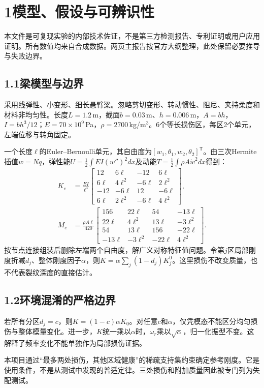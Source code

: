 \documentclass[UTF8,a4paper,11pt,fontset=fandol]{ctexart}
\begin{document}
\section*{1\quad 模型、假设与可辨识性}
本文件是可复现实验的内部技术佐证，不是第三方检测报告、专利证明或用户应用证明。所有数值均来自合成数据。两页主报告按官方大纲整理，此处保留必要推导与失败边界。
\subsection*{1.1\quad 梁模型与边界}
采用线弹性、小变形、细长悬臂梁。忽略剪切变形、转动惯性、阻尼、夹持柔度和材料非均匀性。长度$L=1.2$\,m，截面$b=0.03$\,m、$h=0.006$\,m，$A=bh$，$I=bh^3/12$；$E=70\times10^9$\,Pa，$\rho=2700$\,kg/m$^3$。6个等长损伤区，每区2个单元，左端位移与转角固定。

一个长度$\ell$的Euler--Bernoulli单元，其自由度为$[w_1,\theta_1,w_2,\theta_2]^\mathsf T$。由三次Hermite插值$w=Nq$，弹性能$U=\frac12\int EI(w'')^2dx$及动能$T=\frac12\int\rho A\dot w^2dx$得到：
\begin{align*}
K_e&=\frac{EI}{\ell^3}\begin{bmatrix}12&6\ell&-12&6\ell\\6\ell&4\ell^2&-6\ell&2\ell^2\\-12&-6\ell&12&-6\ell\\6\ell&2\ell^2&-6\ell&4\ell^2\end{bmatrix},\\
M_e&=\frac{\rho A\ell}{420}\begin{bmatrix}156&22\ell&54&-13\ell\\22\ell&4\ell^2&13\ell&-3\ell^2\\54&13\ell&156&-22\ell\\-13\ell&-3\ell^2&-22\ell&4\ell^2\end{bmatrix}.
\end{align*}
按节点连接组装后删除左端两个自由度，解广义对称特征值问题。令第$j$区局部刚度折减$d_j$、整体刚度因子$\alpha$，则$K=\alpha\sum_j(1-d_j)K_j^0$。这里损伤不改变质量，也不代表裂纹深度的直接估计。
\subsection*{1.2\quad 环境混淆的严格边界}
若所有分区$d_j=c$，则$K=(1-c)\alpha K_0$。对任意$c$和$\alpha$，仅凭模态不能区分均匀损伤与整体模量变化。进一步，$K$统一乘以$\alpha$时，$\omega_r$乘以$\sqrt\alpha$，归一化振型不变。这解释了频率变化不能单独作为局部损伤证据。

本项目通过“最多两处损伤，其他区域健康”的稀疏支持集约束确定参考刚度。它是使用条件，不是从测试中发现的普适定律。三处损伤和附加质量因此被专门列为失配测试。
\end{document}
